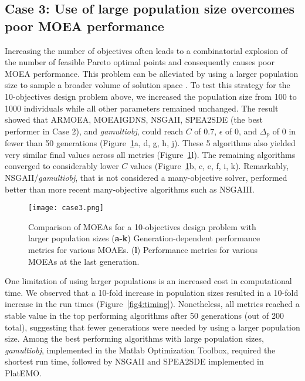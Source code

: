 {\subsection{Case 3: Use of large population size overcomes poor MOEA performance}
Increasing the number of objectives often leads to a combinatorial explosion of the number of feasible Pareto optimal points and consequently causes poor MOEA performance. This problem can be alleviated by using a larger population size to sample a broader volume of solution space \cite{ishibuchi2009}.
To test this strategy for the 10-objectives design problem above, we increased the population size from 100 to 1000 individuals while all other parameters remained unchanged.
The result showed that
ARMOEA,
MOEAIGDNS,
NSGAII,
SPEA2SDE (the best performer in Case 2),
and \textit{gamultiobj},
could reach $C$ of 0.7, $\epsilon$ of 0, and $\Delta_p$ of 0 in fewer than 50 generations (Figure~\ref{fig4:case3}a, d, g, h, j).
These 5 algorithms also yielded very similar final values across all metrics  (Figure~\ref{fig4:case3}l). The remaining algorithms converged to considerably lower $C$ values (Figure~\ref{fig4:case3}b, c, e, f, i, k).
Remarkably, NSGAII/\textit{gamultiobj}, that is not considered a many-objective solver, performed better than more recent many-objective algorithms such as NSGAIII.

\begin{figure}[p]
    \centering
    \texttt{[image: case3.png]}
    \caption[Comparison of MOEAs with increased population sizes]{Comparison of MOEAs for a 10-objectives design problem with larger population sizes
	(\textbf{a-k}) Generation-dependent performance metrics for various MOAEs.	(\textbf{l}) Performance metrics for various MOEAs at the last generation.}
\label{fig4:case3}
\end{figure}

One limitation of using larger populations is an increased cost in computational time. We observed that a 10-fold increase in population sizes resulted in a 10-fold increase in the run times (Figure~\ref{fig4:timing}). Nonetheless, all metrics reached a stable value in the top performing algorithms after 50 generations (out of 200 total), suggesting that fewer generations were needed by using a larger population size.  Among the best performing algorithms with large population sizes, \textit{gamultiobj}, implemented in the Matlab Optimization Toolbox, required the shortest run time, followed by NSGAII and SPEA2SDE implemented in PlatEMO.


}
